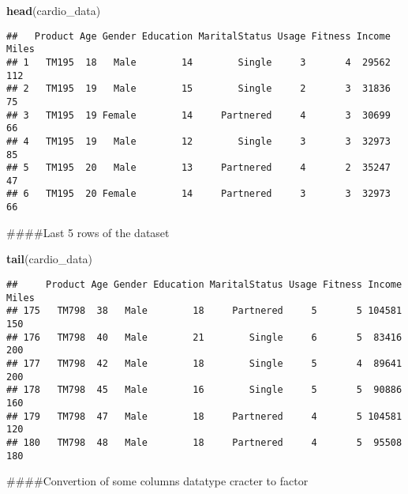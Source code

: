 \documentclass[
]{article}
\newenvironment{Shaded}{\begin{snugshade}}{\end{snugshade}}
\newcommand{\KeywordTok}[1]{\textcolor[rgb]{0.13,0.29,0.53}{\textbf{#1}}}
\newcommand{\NormalTok}[1]{#1}
\newcommand{\OperatorTok}[1]{\textcolor[rgb]{0.81,0.36,0.00}{\textbf{#1}}}
\newcommand{\StringTok}[1]{\textcolor[rgb]{0.31,0.60,0.02}{#1}}
\begin{document}
\begin{Shaded}
\begin{Highlighting}[]
\KeywordTok{head}\NormalTok{(cardio_data)}
\end{Highlighting}
\end{Shaded}

\begin{verbatim}
##   Product Age Gender Education MaritalStatus Usage Fitness Income Miles
## 1   TM195  18   Male        14        Single     3       4  29562   112
## 2   TM195  19   Male        15        Single     2       3  31836    75
## 3   TM195  19 Female        14     Partnered     4       3  30699    66
## 4   TM195  19   Male        12        Single     3       3  32973    85
## 5   TM195  20   Male        13     Partnered     4       2  35247    47
## 6   TM195  20 Female        14     Partnered     3       3  32973    66
\end{verbatim}

\#\#\#\#Last 5 rows of the dataset

\begin{Shaded}
\begin{Highlighting}[]
\KeywordTok{tail}\NormalTok{(cardio_data)}
\end{Highlighting}
\end{Shaded}

\begin{verbatim}
##     Product Age Gender Education MaritalStatus Usage Fitness Income Miles
## 175   TM798  38   Male        18     Partnered     5       5 104581   150
## 176   TM798  40   Male        21        Single     6       5  83416   200
## 177   TM798  42   Male        18        Single     5       4  89641   200
## 178   TM798  45   Male        16        Single     5       5  90886   160
## 179   TM798  47   Male        18     Partnered     4       5 104581   120
## 180   TM798  48   Male        18     Partnered     4       5  95508   180
\end{verbatim}

\#\#\#\#Convertion of some columns datatype cracter to factor

\begin{Shaded}
\end{Shaded}
\end{document}
